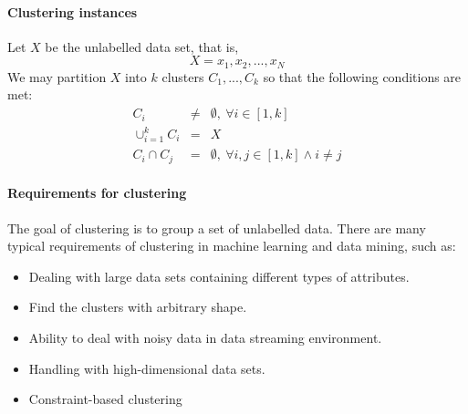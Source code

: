 \paragraph{Clustering instances} Let $X$ be the unlabelled data set, that is,
\begin{equation*}
    X = {x_1, x_2, ..., x_N}    
\end{equation*}
We may partition $X$ into $k$ clusters $C_1, ..., C_k$ so that the following conditions are met:
\begin{eqnarray*}
    C_i &\neq& \emptyset, ~\forall i \in [1, k] \\
    \cup_{i=1}^k C_i &=& X\\
    C_i \cap C_j &=& \emptyset, ~\forall i,j \in [1,k] \wedge i \neq j
\end{eqnarray*}

\paragraph{Requirements for clustering} The goal of clustering is to group a set of unlabelled data. There are many typical requirements of clustering in machine learning and data
mining, such as: 
\begin{itemize}
    \item Dealing with large data sets containing different types of attributes.
    \item Find the clusters with arbitrary shape.
    \item Ability to deal with noisy data in data streaming environment.
    \item Handling with high-dimensional data sets.
    \item Constraint-based clustering
\end{itemize}

